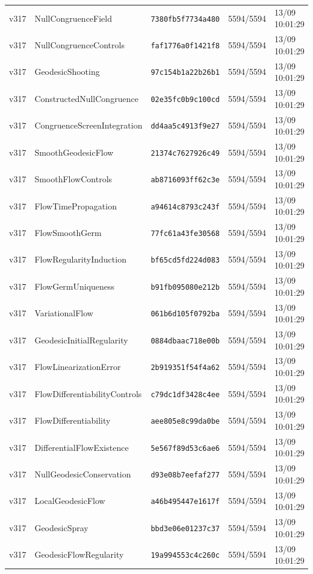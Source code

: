 \documentclass[11pt]{article}
\theoremstyle{definition}\newtheorem{deriv}{Derivação}
\begin{document}
{\begin{longtable}{@{}lllll@{}}
v317 & NullCongruenceField & \texttt{7380fb5f7734a480} & 5594/5594 & 13/09 10:01:29 \\
v317 & NullCongruenceControls & \texttt{faf1776a0f1421f8} & 5594/5594 & 13/09 10:01:29 \\
v317 & GeodesicShooting & \texttt{97c154b1a22b26b1} & 5594/5594 & 13/09 10:01:29 \\
v317 & ConstructedNullCongruence & \texttt{02e35fc0b9c100cd} & 5594/5594 & 13/09 10:01:29 \\
v317 & CongruenceScreenIntegration & \texttt{dd4aa5c4913f9e27} & 5594/5594 & 13/09 10:01:29 \\
v317 & SmoothGeodesicFlow & \texttt{21374c7627926c49} & 5594/5594 & 13/09 10:01:29 \\
v317 & SmoothFlowControls & \texttt{ab8716093ff62c3e} & 5594/5594 & 13/09 10:01:29 \\
v317 & FlowTimePropagation & \texttt{a94614c8793c243f} & 5594/5594 & 13/09 10:01:29 \\
v317 & FlowSmoothGerm & \texttt{77fc61a43fe30568} & 5594/5594 & 13/09 10:01:29 \\
v317 & FlowRegularityInduction & \texttt{bf65cd5fd224d083} & 5594/5594 & 13/09 10:01:29 \\
v317 & FlowGermUniqueness & \texttt{b91fb095080e212b} & 5594/5594 & 13/09 10:01:29 \\
v317 & VariationalFlow & \texttt{061b6d105f0792ba} & 5594/5594 & 13/09 10:01:29 \\
v317 & GeodesicInitialRegularity & \texttt{0884dbaac718e00b} & 5594/5594 & 13/09 10:01:29 \\
v317 & FlowLinearizationError & \texttt{2b919351f54f4a62} & 5594/5594 & 13/09 10:01:29 \\
v317 & FlowDifferentiabilityControls & \texttt{c79dc1df3428c4ee} & 5594/5594 & 13/09 10:01:29 \\
v317 & FlowDifferentiability & \texttt{aee805e8c99da0be} & 5594/5594 & 13/09 10:01:29 \\
v317 & DifferentialFlowExistence & \texttt{5e567f89d53c6ae6} & 5594/5594 & 13/09 10:01:29 \\
v317 & NullGeodesicConservation & \texttt{d93e08b7eefaf277} & 5594/5594 & 13/09 10:01:29 \\
v317 & LocalGeodesicFlow & \texttt{a46b495447e1617f} & 5594/5594 & 13/09 10:01:29 \\
v317 & GeodesicSpray & \texttt{bbd3e06e01237c37} & 5594/5594 & 13/09 10:01:29 \\
v317 & GeodesicFlowRegularity & \texttt{19a994553c4c260c} & 5594/5594 & 13/09 10:01:29 \\

\end{longtable}}
\end{document}
